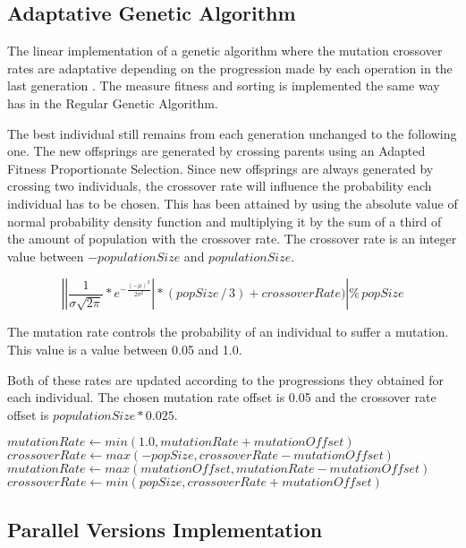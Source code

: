 \documentclass[runningheads]{llncs}
\begin{document}
\subsection{Adaptative Genetic Algorithm}
The linear implementation of a genetic algorithm where the mutation crossover rates are adaptative  depending on the progression made by each operation in the last generation \cite{adaptativeCrossOverMutation}. The measure fitness and sorting is implemented the same way has in the Regular Genetic Algorithm.

The best individual still remains from each generation unchanged to the following one. The new offsprings are generated by crossing parents using an Adapted Fitness Proportionate Selection. Since new offsprings are always generated by crossing two individuals, the crossover rate will influence the probability each individual has to be chosen. This has been attained by using the absolute value of  normal probability density function and multiplying it by the sum of a third of the amount of population with the crossover rate. The crossover rate is an integer value between \(-populationSize\) and \(populationSize\).

\[ \left |\left | \frac{1}{\sigma \sqrt{2\pi}}*e^{-\frac{(-\mu)^2}{2\sigma^2}} \right | * (popSize\,/\,3) + crossoverRate)  \right | \%  \, popSize \]	

The mutation rate controls the probability of an individual to suffer a mutation. This value is a value between 0.05 and 1.0.

Both of these rates are updated according to the progressions they obtained for each individual. The chosen mutation rate offset is 0.05 and the crossover rate offset is \(populationSize * 0.025\).

\begin{algorithmic}
        \State $mutationRate \gets min(1.0, mutationRate + mutationOffset)$
        \State $crossoverRate \gets max(-popSize, crossoverRate - mutationOffset)$
\EndIf
{}
        \State $mutationRate \gets max(mutationOffset, mutationRate - mutationOffset)$
        \State $crossoverRate \gets min(popSize, crossoverRate + mutationOffset)$
\EndIf
\end{algorithmic}

\subsection{Parallel Versions Implementation}
\end{document}
